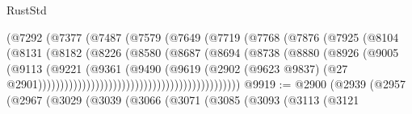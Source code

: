 \begin{lexlean}{RustStd}
\begin{coremodule}
                                          (@7292
                                            (@7377
                                              (@7487
                                                (@7579
                                                  (@7649
                                                    (@7719
                                                      (@7768
                                                        (@7876
                                                          (@7925
                                                            (@8104
                                                              (@8131
                                                                (@8182
                                                                  (@8226
                                                                    (@8580
                                                                      (@8687
                                                                        (@8694
                                                                          (@8738
                                                                            (@8880
                                                                              (@8926
                                                                                (@9005
                                                                                  (@9113
                                                                                    (@9221
                                                                                      (@9361
                                                                                        (@9490
                                                                                          (@9619
                                                                                            (@2902
                                                                                              (@9623
                                                                                                @9837)
                                                                                              (@27
                                                                                                @2901))))))))))))))))))))))))))))))))))))))))))))))
@9919 := @2900
    (@2939
      (@2957
        (@2967
          (@3029
            (@3039
              (@3066
                (@3071
                  (@3085
                    (@3093
                      (@3113
                        (@3121

\end{coremodule}
\end{lexlean}
